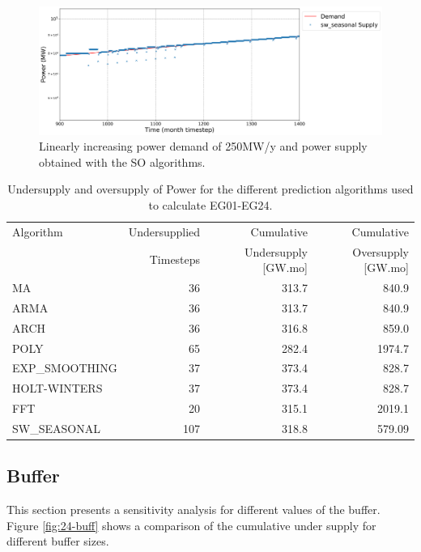 \documentclass[11pt]{article}
\begin{document}
\begin{figure}[H]
	\centering
	\includegraphics[width=\textwidth]{24-figures/lin-24-power-buffer03.png} 
	\hfill
	\caption{Linearly increasing power demand of 250MW/y and power supply obtained with the SO algorithms.}
	\label{fig:24-lin-SO}
\end{figure}

\begin{table}[H]
	\centering
	\caption{Undersupply and oversupply of Power for the different prediction algorithms used to calculate EG01-EG24.}
	\label{tab:24-lin-power}
	\begin{tabularx}{\textwidth}{lRRR}
		\hline
		Algorithm & Undersupplied & Cumulative  & Cumulative \\
		& Timesteps     & Undersupply [GW.mo]  & Oversupply [GW.mo] \\ \hline
		MA        & 36 	& 313.7 & 840.9 \\ 
		ARMA      & 36 	& 313.7 & 840.9 \\ 
		ARCH      & 36 	& 316.8 & 859.0 \\ 
		POLY      &  65 & 282.4 & 1974.7 \\ 
		EXP\_SMOOTHING 	& 37 & 373.4 & 828.7 \\ 
		HOLT-WINTERS  	& 37 & 373.4 & 828.7 \\ 
		FFT       & 20	& 315.1	& 2019.1 \\ 
		SW\_SEASONAL    & 107 & 318.8 & 579.09 \\ \hline
	\end{tabularx}
\end{table}

\subsection{Buffer}

This section presents a sensitivity analysis for different values of the buffer. Figure \ref{fig:24-buff} shows a comparison of the cumulative under supply for different buffer sizes.
\end{document}
